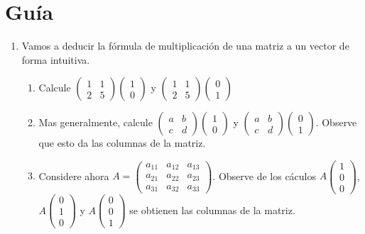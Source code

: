 \documentclass[12pt]{article}
\theoremstyle{exampstyle}
\theoremstyle{definition}
\theoremstyle{break}
\numberwithin{equation}{section}
\begin{document}
\section{Guía}

\begin{enumerate}

    
    \item Vamos a deducir la fórmula de multiplicación de una matriz a un vector de forma intuitiva.
    \begin{enumerate}
        \item Calcule $\begin{pmatrix} 1 & 1 \\ 2 & 5 \end{pmatrix} \begin{pmatrix} 1 \\ 0 \end{pmatrix}$ y $\begin{pmatrix} 1 & 1 \\ 2 & 5 \end{pmatrix} \begin{pmatrix} 0 \\ 1 \end{pmatrix}$
        \item Mas generalmente, calcule $\begin{pmatrix} a & b \\ c & d \end{pmatrix} \begin{pmatrix} 1 \\ 0 \end{pmatrix}$ y $\begin{pmatrix} a & b \\ c & d \end{pmatrix} \begin{pmatrix} 0 \\ 1 \end{pmatrix}$. Observe que esto da las columnas de la matriz.
        \item Considere ahora $A= \begin{pmatrix} a_{11} & a_{12} & a_{13} \\ a_{21} & a_{22} & a_{23} \\ a_{31} & a_{32} & a_{33} \end{pmatrix}$. Observe de los cáculos $A \begin{pmatrix} 1 \\ 0 \\ 0 \end{pmatrix}$, $A \begin{pmatrix} 0 \\ 1 \\ 0 \end{pmatrix}$ y $A \begin{pmatrix} 0 \\ 0 \\ 1 \end{pmatrix}$ se obtienen las columnas de la matriz.

\end{enumerate}
\end{enumerate}
\end{document}

